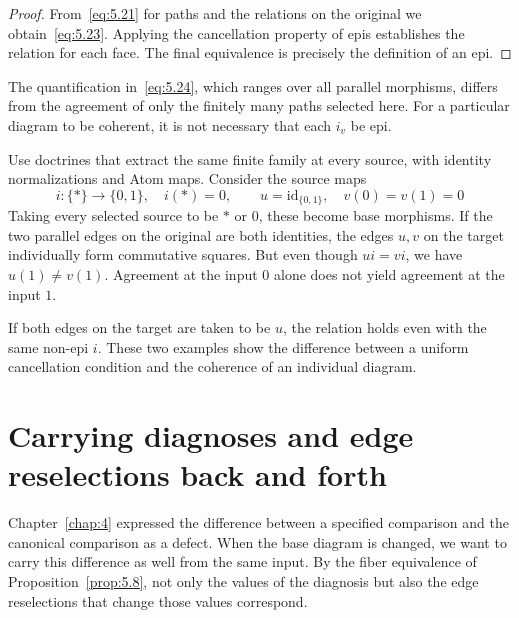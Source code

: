 \begin{proof}

From~\eqref{eq:5.21} for paths and the relations on the original we
obtain~\eqref{eq:5.23}. Applying the cancellation property of epis establishes the relation
for each face. The final equivalence is precisely the definition of an epi.

\end{proof}

The quantification in~\eqref{eq:5.24}, which ranges over all parallel morphisms, differs
from the agreement of only the finitely many paths selected here. For a particular diagram
to be coherent, it is not necessary that each $i_v$ be epi.

\begin{example}\label{ex:5.20}

Use doctrines that extract the same finite family at every source, with identity
normalizations and Atom maps. Consider the source maps
\begin{equation*}
i:\{*\}\to\{0,1\},\quad i(*)=0,\qquad
u=\mathrm{id}_{\{0,1\}},\quad v(0)=v(1)=0
\tag{5.25}\label{eq:5.25}
\end{equation*}
Taking every selected source to be $*$ or $0$, these become base morphisms. If the two
parallel edges on the original are both identities, the edges $u,v$ on the target
individually form commutative squares. But even though $ui=vi$, we have $u(1)\ne v(1)$.
Agreement at the input $0$ alone does not yield agreement at the input $1$.

If both edges on the target are taken to be $u$, the relation holds even with the same
non-epi $i$. These two examples show the difference between a uniform cancellation
condition and the coherence of an individual diagram.

\end{example}

\section{Carrying diagnoses and edge reselections back and forth}\label{sec:5.6}

Chapter~\ref{chap:4} expressed the difference between a specified comparison and the
canonical comparison as a defect. When the base diagram is changed, we want to carry this
difference as well from the same input. By the fiber equivalence of
Proposition~\ref{prop:5.8}, not only the values of the diagnosis but also the edge
reselections that change those values correspond.

